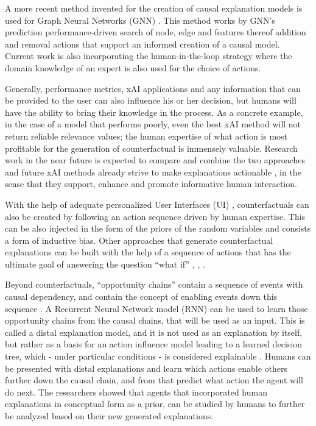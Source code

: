 \documentclass[twoside,11pt]{article}
\begin{document}

A more recent method invented for the creation of causal explanation models is used for Graph Neural Networks (GNN) \cite{Vu:2020:PGMExplainer}. This method works by GNN's prediction performance-driven search of node, edge and features thereof addition and removal actions that support an informed creation of a causal model. Current work is also incorporating the human-in-the-loop strategy \cite{Holzinger:2016:iML} where the domain knowledge of an expert is also used for the choice of actions. 


Generally, performance metrics, xAI applications and any information that can be provided to the user can also influence his or her decision, but humans will have the ability to bring their knowledge in the process. As a concrete example, in the case of a model that performs poorly, even the best xAI method will not return reliable relevance values; the human expertise of what action is most profitable for the generation of counterfactual is immensely valuable. Research work in the near future is expected to compare and combine the two approaches and future xAI methods already strive to make explanations actionable \cite{Pfeifer:2021:NetworkModuleDetection}, in the sense that they support, enhance and promote informative human interaction.


With the help of adequate personalized User Interfaces (UI) \cite{Sun:2021:TopologyPerturbationGNNs}, counterfactuals can also be created by following an action sequence driven by human expertise. This can be also injected in the form of the priors of the random variables and consists a form of inductive bias.  Other approaches that generate counterfactual explanations \cite{HolzingerEtAl:2021:MultiModalCausabilityGNN} can be built with the help of a sequence of actions that has the ultimate goal of answering the question ``what if'' \cite{Pearl:2018:CausalCounterfactualInference}, \cite{Pearl:2018:TheBookOfWhy}, \cite{Marletto:2021:ScienceCanCant}.


Beyond counterfactuals, ``opportunity chains'' contain a sequence of events with causal dependency, and contain the concept of enabling events down this sequence \cite{Madumal:2020:DistalEF}. A Recurrent Neural Network model (RNN) \cite{Hochreiter:1997:Lstm} can be used to learn those opportunity chains from the causal chains, that will be used as an input. This is called a distal explanation model, and it is not used as an explanation by itself, but rather as a basis for an action influence model leading to a learned decision tree, which - under particular conditions - is considered explainable \cite{Jung:2020:ExplainableEmpiricalRiskMinimization}. Humans can be presented with distal explanations and learn which actions enable others further down the causal chain, and from that predict what action the agent will do next. The researchers showed that agents that incorporated human explanations in conceptual form as a prior, can be studied by humans to further be analyzed based on their new generated explanations.
\end{document}

